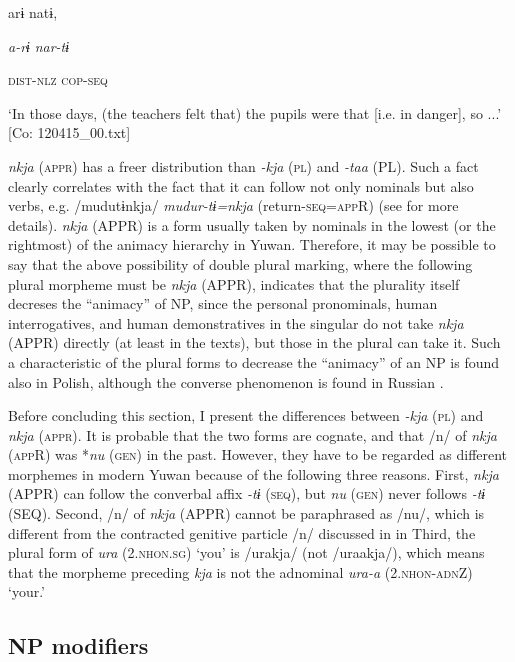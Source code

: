     arɨ  natɨ,

    \textit{a-rɨ}  \textit{nar-tɨ}

    \textsc{dist}-\textsc{nlz}  \textsc{cop}-\textsc{seq}

\glt    ‘In those days, (the teachers felt that) the pupils were that [i.e. in danger], so ...’ [Co: 120415\_00.txt]
\z

\textit{nkja} (\textsc{appr}) has a freer distribution than \textit{{}-kja} (\textsc{pl}) and \textit{{}-taa} (PL). Such a fact clearly correlates with the fact that it can follow not only nominals but also verbs, e.g. /mudutɨnkja/ \textit{mudur-tɨ=nkja} (return-\textsc{seq}=\textsc{app}R) (see for more details). \textit{nkja} (APPR) is a form usually taken by nominals in the lowest (or the rightmost) of the animacy hierarchy in Yuwan. Therefore, it may be possible to say that the above possibility of double plural marking, where the following plural morpheme must be \textit{nkja} (APPR), indicates that the plurality itself decreses the “animacy” of NP, since the personal pronominals, human interrogatives, and human demonstratives in the singular do not take \textit{nkja} (APPR) directly (at least in the texts), but those in the plural can take it. Such a characteristic of the plural forms to decrease the “animacy” of an NP is found also in Polish, although the converse phenomenon is found in Russian \citep[188]{Comrie1989}.

  Before concluding this section, I present the differences between \textit{{}-kja} (\textsc{pl}) and \textit{nkja} (\textsc{appr}). It is probable that the two forms are cognate, and that /n/ of \textit{nkja} (\textsc{app}R) was *\textit{nu} (\textsc{gen}) in the past. However, they have to be regarded as different morphemes in modern Yuwan because of the following three reasons. First, \textit{nkja} (APPR) can follow the converbal affix \textit{-tɨ} (\textsc{seq}), but \textit{nu} (\textsc{gen}) never follows \textit{{}-tɨ} (SEQ). Second, /n/ of \textit{nkja} (APPR) cannot be paraphrased as /nu/, which is different from the contracted genitive particle /n/ discussed in  in  Third, the plural form of \textit{ura} (2.\textsc{nhon}.\textsc{sg}) ‘you’ is /urakja/ (not /uraakja/), which means that the morpheme preceding \textit{kja} is not the adnominal \textit{ura-a} (2.\textsc{nhon}-\textsc{adn}Z) ‘your.’

\subsection{NP modifiers}

